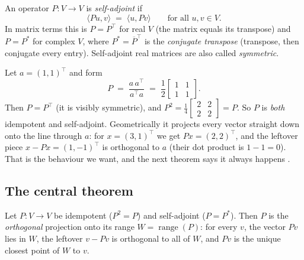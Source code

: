 \begin{definition}
\label{def:selfadjoint}
An operator $P : V \to V$ is \emph{self-adjoint} if
\[
  \langle Pu, v \rangle \;=\; \langle u, Pv \rangle \qquad \text{for all } u,v \in V.
\]
In matrix terms this is $P = P^\top$ for real $V$ (the matrix equals its transpose)
and $P = P^\ast$ for complex $V$, where $P^\ast = \overline{P}^{\top}$ is the
\emph{conjugate transpose} (transpose, then conjugate every entry). Self-adjoint real
matrices are also called \emph{symmetric}.
\end{definition}

\begin{example}
\label{ex:lineproj}
Let $a = (1,1)^\top$ and form
\[
  P \;=\; \frac{a\,a^\top}{a^\top a}
        \;=\; \frac{1}{2}\begin{bmatrix} 1 & 1 \\ 1 & 1 \end{bmatrix}.
\]
Then $P = P^\top$ (it is visibly symmetric), and $P^2 = \tfrac14
\left[\begin{smallmatrix} 2 & 2 \\ 2 & 2 \end{smallmatrix}\right] = P$. So $P$ is
\emph{both} idempotent and self-adjoint. Geometrically it projects every vector
straight down onto the line through $a$: for $x = (3,1)^\top$ we get $Px = (2,2)^\top$,
and the leftover piece $x - Px = (1,-1)^\top$ is orthogonal to $a$ (their dot product
is $1 - 1 = 0$). That is the behaviour we want, and the next theorem says it always
happens \citep{projectors_tamu,wiki_projection}.
\end{example}

\subsection{The central theorem}

\begin{theorem}
\label{thm:orthoproj}
Let $P : V \to V$ be idempotent ($P^2 = P$) and self-adjoint ($P = P^\ast$). Then $P$
is the \emph{orthogonal} projection onto its range $W = \operatorname{range}(P)$:
for every $v$, the vector $Pv$ lies in $W$, the leftover $v - Pv$ is orthogonal to
all of $W$, and $Pv$ is the unique closest point of $W$ to $v$.
\end{theorem}

